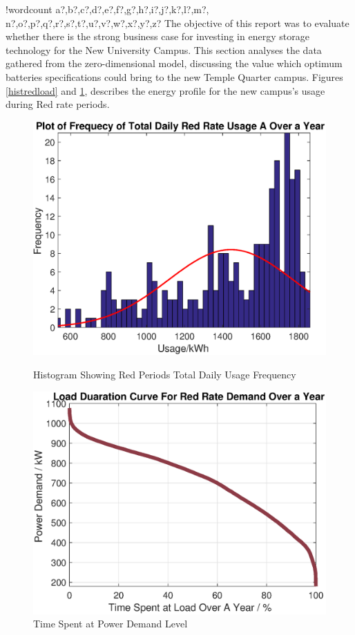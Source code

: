 \documentclass[fontsize=9.5pt]{extarticle}
\numberwithin{figure}{section} %
\newcounter{words}
\newenvironment{counted}{%
  \setcounter{words}{0}
  \SearchList!{wordcount}{\stepcounter{words}}
    {a?,b?,c?,d?,e?,f?,g?,h?,i?,j?,k?,l?,m?,
    n?,o?,p?,q?,r?,s?,t?,u?,v?,w?,x?,y?,z?}
  \UndoBoundary{'}
  \SearchOrder{p;}}{%
  \StopSearching}
\begin{document}
\begin{counted}
The objective of this report was to evaluate whether there is the strong
business case for investing in energy storage technology for the New
University Campus. This section analyses the data gathered from the
zero-dimensional model, discussing the value which optimum batteries
specifications could bring to the new Temple Quarter campus. Figures
\ref{histredload} and \ref{redloadperc}, describes the energy profile
for the new campus's usage during Red rate periods.

\begin{figure}[H]
\centering
\begin{minipage}{.495\textwidth}
  \centering
 \includegraphics[trim = 0 0 0 0, clip, width=1\textwidth]{histredload.eps}
 \vspace{-20pt}
 \caption{Histogram Showing Red Periods Total Daily Usage Frequency}
 \label{histredload}
\end{minipage}
\hfill
\begin{minipage}{.495\textwidth}
  \centering
 \includegraphics[trim = 0 0 0 0, clip, width=1\textwidth]{redloadperc.eps}
 \vspace{-20pt}
   \caption{Time Spent at Power Demand Level}
  \label{redloadperc}
\end{minipage}
\vspace{-30pt}
\end{figure}


\end{counted}
\end{document}
